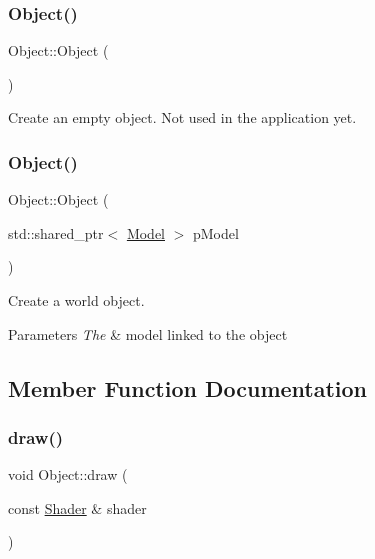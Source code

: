 \subsubsection{\texorpdfstring{Object()}{Object()}\hspace{0.1cm}{\footnotesize\ttfamily [1/2]}}
{\footnotesize\ttfamily Object\+::\+Object (\begin{DoxyParamCaption}{ }\end{DoxyParamCaption})}



Create an empty object. Not used in the application yet. 

\mbox{\label{classObject_a30ff0733f6b70bc1037d58b927237a0c}} 
\subsubsection{\texorpdfstring{Object()}{Object()}\hspace{0.1cm}{\footnotesize\ttfamily [2/2]}}
{\footnotesize\ttfamily Object\+::\+Object (\begin{DoxyParamCaption}\item[{std\+::shared\+\_\+ptr$<$ \hyperlink{classModel}{Model} $>$}]{p\+Model }\end{DoxyParamCaption})}



Create a world object. 


\begin{DoxyParams}{Parameters}
{\em The} & model linked to the object \\
\hline
\end{DoxyParams}


\subsection{Member Function Documentation}
\mbox{\label{classObject_ad9684af664b6b318174bb147d88131fe}} 
\subsubsection{\texorpdfstring{draw()}{draw()}}
{\footnotesize\ttfamily void Object\+::draw (\begin{DoxyParamCaption}\item[{const \hyperlink{classShader}{Shader} \&}]{shader }\end{DoxyParamCaption})}



